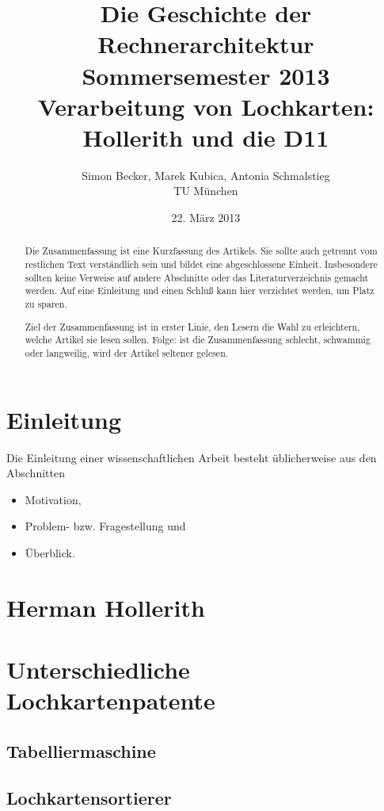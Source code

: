 \documentclass[parskip=half]{scrartcl}
\author{Simon Becker, Marek Kubica, Antonia Schmalstieg\\ TU München}
\title{Die Geschichte der Rechnerarchitektur\\
Sommersemester 2013\\
\textbf{Verarbeitung von Lochkarten: Hollerith und die D11}}
\date{22. März 2013}
\begin{document}
\maketitle

\begin{abstract}

Die Zusammenfassung ist eine Kurzfassung des Artikels. Sie sollte
auch getrennt vom restlichen Text verständlich sein
und bildet eine abgeschlossene Einheit. Insbesondere sollten keine
Verweise auf andere Abschnitte
oder das Literaturverzeichnis gemacht werden. Auf eine Einleitung
und einen Schluß kann hier verzichtet werden, um Platz zu sparen.

Ziel der Zusammenfassung ist in erster Linie, den Lesern die Wahl
zu erleichtern, welche Artikel sie lesen sollen. Folge: ist die
Zusammenfassung schlecht, schwammig oder langweilig, wird der
Artikel seltener gelesen.
\end{abstract}

\section{Einleitung}

\label{sec:einleitung}

Die Einleitung einer wissenschaftlichen Arbeit besteht üblicherweise
aus den Abschnitten
\begin{itemize}
	\item Motivation,
	\item Problem- bzw. Fragestellung und
	\item Überblick.
\end{itemize}


\section{Herman Hollerith}


\section{Unterschiedliche Lochkartenpatente}

\subsection{Tabelliermaschine}
\subsection{Lochkartensortierer}
\end{document}
